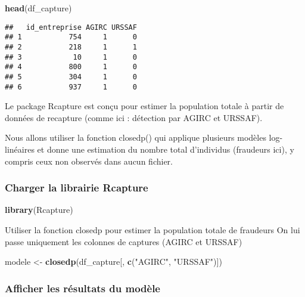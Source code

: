 \documentclass[
]{article}
\newenvironment{Shaded}{\begin{snugshade}}{\end{snugshade}}
\newcommand{\FunctionTok}[1]{\textcolor[rgb]{0.13,0.29,0.53}{\textbf{#1}}}
\newcommand{\NormalTok}[1]{#1}
\newcommand{\OtherTok}[1]{\textcolor[rgb]{0.56,0.35,0.01}{#1}}
\newcommand{\StringTok}[1]{\textcolor[rgb]{0.31,0.60,0.02}{#1}}
\begin{document}
\begin{Shaded}
\begin{Highlighting}[]
\FunctionTok{head}\NormalTok{(df\_capture)}
\end{Highlighting}
\end{Shaded}

\begin{verbatim}
##   id_entreprise AGIRC URSSAF
## 1           754     1      0
## 2           218     1      1
## 3            10     1      0
## 4           800     1      0
## 5           304     1      0
## 6           937     1      0
\end{verbatim}

Le package Rcapture est conçu pour estimer la population totale à partir
de données de recapture (comme ici : détection par AGIRC et URSSAF).

Nous allons utiliser la fonction closedp() qui applique plusieurs
modèles log-linéaires et donne une estimation du nombre total
d'individus (fraudeurs ici), y compris ceux non observés dans aucun
fichier.

\subsubsection{Charger la librairie
Rcapture}\label{charger-la-librairie-rcapture}

\begin{Shaded}
\begin{Highlighting}[]
\FunctionTok{library}\NormalTok{(Rcapture)}
\end{Highlighting}
\end{Shaded}

Utiliser la fonction closedp pour estimer la population totale de
fraudeurs On lui passe uniquement les colonnes de captures (AGIRC et
URSSAF)

\begin{Shaded}
\begin{Highlighting}[]
\NormalTok{modele }\OtherTok{\textless{}{-}} \FunctionTok{closedp}\NormalTok{(df\_capture[, }\FunctionTok{c}\NormalTok{(}\StringTok{"AGIRC"}\NormalTok{, }\StringTok{"URSSAF"}\NormalTok{)])}
\end{Highlighting}
\end{Shaded}

\subsubsection{Afficher les résultats du
modèle}\label{afficher-les-ruxe9sultats-du-moduxe8le}
\end{document}
